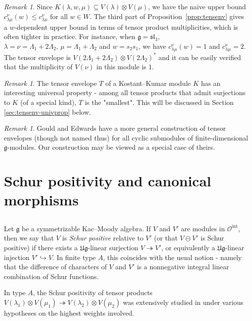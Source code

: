 \documentclass[12pt,reqno]{amsart}
\theoremstyle{plain}
\theoremstyle{definition}
\theoremstyle{remark}
\newtheorem{rem}[theorem]{Remark}
\theoremstyle{plain}
\newcommand{\catoint}{\mathcal{O}^{\mathrm{int}}}
\newcommand{\lie}{\mathfrak}
\newcommand{\lrw}{c_{\lambda\mu}^\nu(w)}
\newcommand{\lr}{c_{\lambda\mu}^\nu}
\begin{document}
\begin{rem}
Since $K(\lambda,w,\mu) \subseteq V(\lambda) \otimes V(\mu)$, we have the naive upper bound $\lrw \leq \lr$ for all $w \in W$. The third part of Proposition~\ref{prop:tensenv} gives a $w$-dependent upper bound in terms of tensor product multiplicities, which is often tighter in practice. For instance, when $\lie g = \lie{sl}_3$, 
$\lambda =  \nu = \Lambda_1 + 2\Lambda_2, \,\mu = \Lambda_1 + \Lambda_2$ and $w=s_2s_1$, we have $\lrw = 1$ and $\lr = 2$. The tensor envelope is $V(2\Lambda_1 + 2\Lambda_2) \otimes V(2\Lambda_2)^*$ and it can be easily verified that the multiplicity of $V(\nu)$ in this module is $1$. 
\end{rem}


\begin{rem}
The tensor envelope $T$ of a Kostant--Kumar module $K$ has an interesting universal property - among all tensor products that admit surjections to $K$ (of a special kind), $T$ is the "smallest". This will be discussed in Section \ref{sec:tensenv-univprop} below.
\end{rem}

\begin{rem}
    Gould and Edwards \cite[Theorem 4]{GE} have a more general construction of tensor envelopes (though not named thus) for all cyclic submodules of finite-dimensional $\lie{g}$-modules. Our construction may be viewed as a special case of theirs.
\end{rem}
\section{Schur positivity and canonical morphisms}\label{sec:canmors}
\subsection{}
Let $\lie g$ be a symmetrizable Kac--Moody algebra. If $V$ and $V'$ are modules in $\catoint$, then we say that $V$ is {\em Schur positive} relative to $V'$ (or that $V \ominus V'$ is Schur positive) if there exists a $\mathfrak{Ug}$-linear surjection $V \twoheadrightarrow V'$, or equivalently a $\lie{Ug}$-linear injection $V' \hookrightarrow V$. In finite type $A$, this coincides with the usual notion - namely that the difference of characters of $V$ and $V'$ is a nonnegative integral linear combination of Schur functions.

In type $A$, the Schur positivity of tensor products $V(\lambda_1)\otimes V(\mu_1) \twoheadrightarrow V(\lambda_2)\otimes V(\mu_2)$ was extensively studied in \cite{FFLP, LPP, DP, CFS} under various hypotheses on the highest weights involved.
\end{document}

